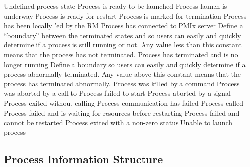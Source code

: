 \begin{constantdesc}
%
Undefined process state
%
Process is ready to be launched
%
Process launch is underway
%
Process is ready for restart
%
Process is marked for termination
%
Process has been locally 'ed by the \ac{RM}
%
Process has connected to PMIx server
%
Define a ``boundary'' between the terminated states and  so users can easily and quickly determine if a process is still running or not.
Any value less than this constant means that the process has not terminated.
%
Process has terminated and is no longer running
%
Define a boundary so users can easily and quickly determine if a process abnormally terminated.
Any value above this constant means that the process has terminated abnormally.
%
Process was killed by a command
%
Process was aborted by a call to 
%
Process failed to start
%
Process aborted by a signal
%
Process exited without calling 
%
Process communication has failed
%
Process called 
%
Process failed and is waiting for resources before restarting
%
Process failed and cannot be restarted
%
Process exited with a non-zero status
%
Unable to launch process
%
\end{constantdesc}


\subsection{Process Information Structure}


